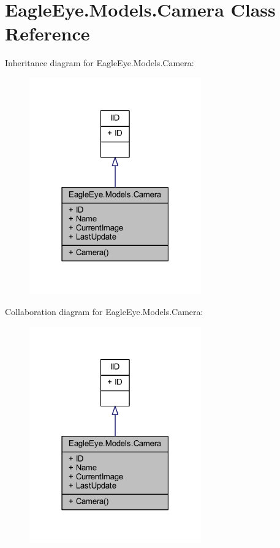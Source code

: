 \hypertarget{class_eagle_eye_1_1_models_1_1_camera}{}\section{Eagle\+Eye.\+Models.\+Camera Class Reference}
\label{class_eagle_eye_1_1_models_1_1_camera}


 




Inheritance diagram for Eagle\+Eye.\+Models.\+Camera\+:\nopagebreak
\begin{figure}[H]
\begin{center}
\leavevmode
\includegraphics[width=210pt]{class_eagle_eye_1_1_models_1_1_camera__inherit__graph}
\end{center}
\end{figure}


Collaboration diagram for Eagle\+Eye.\+Models.\+Camera\+:\nopagebreak
\begin{figure}[H]
\begin{center}
\leavevmode
\includegraphics[width=210pt]{class_eagle_eye_1_1_models_1_1_camera__coll__graph}
\end{center}
\end{figure}
